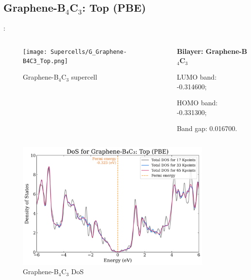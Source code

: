 \documentclass[xcolor=dvipsnames]{beamer}
\begin{document}
\subsection{Graphene-B\texorpdfstring{$_\text{4}$}{4}C\texorpdfstring{$_\text{3}$}{3}: Top (PBE)}
\begin{frame}{\insertsection: \insertsubsection}
\begin{columns}
    \begin{column}{0.5\textwidth}\begin{figure}
        \texttt{[image: Supercells/G\_Graphene-B4C3\_Top.png]}
        \caption{Graphene-B$_\text{4}$C$_\text{3}$ supercell}
    \end{figure}\end{column}
    \begin{column}{0.5\textwidth}
        \par \textbf{Bilayer: Graphene-B$_\text{4}$C$_\text{3}$}
        \par\quad LUMO band: -0.314600;
        \par\quad HOMO band: -0.331300;
        \par\quad Band gap: 0.016700.
    \end{column}
\end{columns}
\begin{columns}
    \begin{column}{0.45\textwidth}\begin{figure}
        \includegraphics[width=1\textwidth]{PDoS/G-B4C3_dos.png}
        \caption{Graphene-B$_\text{4}$C$_\text{3}$ DoS}
    \end{figure}\end{column}
    \begin{column}{0.55\textwidth}\begin{figure}

\end{figure}
\end{column}
\end{columns}
\end{frame}
\end{document}

